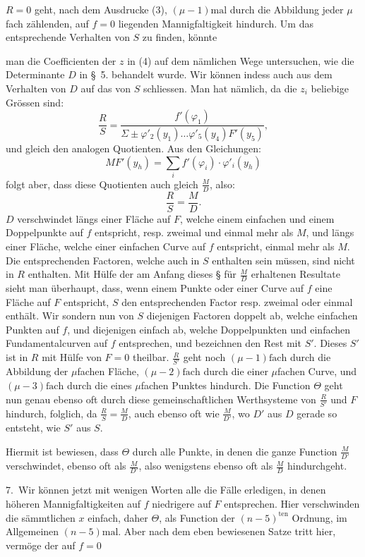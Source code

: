 \documentclass{article}
\begin{document}
$R = 0$ geht, nach dem Ausdrucke (3), $(\mu - 1)\text{mal}$ durch die Abbildung jeder $\mu$fach zählenden, auf $f = 0$ liegenden Mannigfaltigkeit hindurch. Um das entsprechende Verhalten von $S$ zu finden, könnte

man die Coefficienten der $z$ in (4) auf dem nämlichen Wege untersuchen, wie die Determinante $D$ in §~5. behandelt wurde. Wir können indess auch aus dem Verhalten von $D$ auf das von $S$ schliessen. Man hat nämlich, da die $z_i$ beliebige Grössen sind:
\[
\frac{R}{S} = \frac{f'(\varphi_1)}{\Sigma \pm \varphi'_2(y_1) \dots \varphi'_5(y_4) F'(y_5)} ,
\]
und gleich den analogen Quotienten. Aus den Gleichungen:
\[
M F'(y_h) = \sum_i f'(\varphi_i) \cdot \varphi'_i(y_h)
\]
folgt aber, dass diese Quotienten auch gleich $\frac{M}{D}$, also:
\[
\frac{R}{S} = \frac{M}{D} .
\]
$D$ verschwindet längs einer Fläche auf $F$, welche einem einfachen und einem Doppelpunkte auf $f$ entspricht, resp. zweimal und einmal mehr als $M$, und längs einer Fläche, welche einer einfachen Curve auf $f$ entspricht, einmal mehr als $M$. Die entsprechenden Factoren, welche auch in $S$ enthalten sein müssen, sind nicht in $R$ enthalten. Mit Hülfe der am Anfang dieses § für $\frac{M}{D}$ erhaltenen Resultate sieht man überhaupt, dass, wenn einem Punkte oder einer Curve auf $f$ eine Fläche auf $F$ entspricht, $S$ den entsprechenden Factor resp. zweimal oder einmal enthält. Wir sondern nun von $S$ diejenigen Factoren doppelt ab, welche einfachen Punkten auf $f$, und diejenigen einfach ab, welche Doppelpunkten und einfachen Fundamentalcurven auf $f$ entsprechen, und bezeichnen den Rest mit $S'$. Dieses $S'$ ist in $R$ mit Hülfe von $F = 0$ theilbar. $\frac{R}{S'}$ geht noch $(\mu - 1)\text{fach}$ durch die Abbildung der $\mu$fachen Fläche, $(\mu - 2)\text{fach}$ durch die einer $\mu$fachen Curve, und $(\mu - 3)\text{fach}$ durch die eines $\mu$fachen Punktes hindurch. Die Function $\Theta$ geht nun genau ebenso oft durch diese gemeinschaftlichen Werthsysteme von $\frac{R}{S'}$ und $F$ hindurch, folglich, da $\frac{R}{S} = \frac{M}{D}$, auch ebenso oft wie $\frac{M}{D'}$, wo $D'$ aus $D$ gerade so entsteht, wie $S'$ aus $S$.

Hiermit ist bewiesen, dass $\Theta$ durch alle Punkte, in denen die ganze Function $\frac{M}{D'}$ verschwindet, ebenso oft als $\frac{M}{D'}$, also wenigstens ebenso oft als $\frac{M}{D}$ hindurchgeht.

7.~Wir können jetzt mit wenigen Worten alle die Fälle erledigen, in denen höheren Mannigfaltigkeiten auf $f$ niedrigere auf $F$ entsprechen. Hier verschwinden die sämmtlichen $x$ einfach, daher $\Theta$, als Function der $(n - 5)^{\text{ten}}$ Ordnung, im Allgemeinen $(n - 5)\text{mal}$. Aber nach dem eben bewiesenen Satze tritt hier, vermöge der auf $f = 0$
\end{document}
